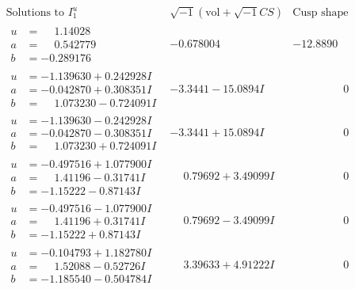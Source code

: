 \documentclass[1p]{elsarticle_modified}
\theoremstyle{definition}
\newcommand{\I}{\sqrt{-1}}
\begin{document}
$$\begin{array}{c|c|c}  
\text{Solutions to }I^u_{1}& \I (\text{vol} + \sqrt{-1}CS) & \text{Cusp shape}\\
 \hline 
\begin{aligned}
u &= \phantom{-}1.14028\phantom{ +0.000000I} \\
a &= \phantom{-}0.542779\phantom{ +0.000000I} \\
b &= -0.289176\phantom{ +0.000000I}\end{aligned}
 & -0.678004\phantom{ +0.000000I} & -12.8890\phantom{ +0.000000I} \\ \hline\begin{aligned}
u &= -1.139630 + 0.242928 I \\
a &= -0.042870 + 0.308351 I \\
b &= \phantom{-}1.073230 - 0.724091 I\end{aligned}
 & -3.3441 - 15.0894 I & \phantom{-0.000000 } 0 \\ \hline\begin{aligned}
u &= -1.139630 - 0.242928 I \\
a &= -0.042870 - 0.308351 I \\
b &= \phantom{-}1.073230 + 0.724091 I\end{aligned}
 & -3.3441 + 15.0894 I & \phantom{-0.000000 } 0 \\ \hline\begin{aligned}
u &= -0.497516 + 1.077900 I \\
a &= \phantom{-}1.41196 - 0.31741 I \\
b &= -1.15222 - 0.87143 I\end{aligned}
 & \phantom{-}0.79692 + 3.49099 I & \phantom{-0.000000 } 0 \\ \hline\begin{aligned}
u &= -0.497516 - 1.077900 I \\
a &= \phantom{-}1.41196 + 0.31741 I \\
b &= -1.15222 + 0.87143 I\end{aligned}
 & \phantom{-}0.79692 - 3.49099 I & \phantom{-0.000000 } 0 \\ \hline\begin{aligned}
u &= -0.104793 + 1.182780 I \\
a &= \phantom{-}1.52088 - 0.52726 I \\
b &= -1.185540 - 0.504784 I\end{aligned}
 & \phantom{-}3.39633 + 4.91222 I & \phantom{-0.000000 } 0 \\ \hline\begin{aligned}

\end{aligned}
\end{array}$$
\end{document}
